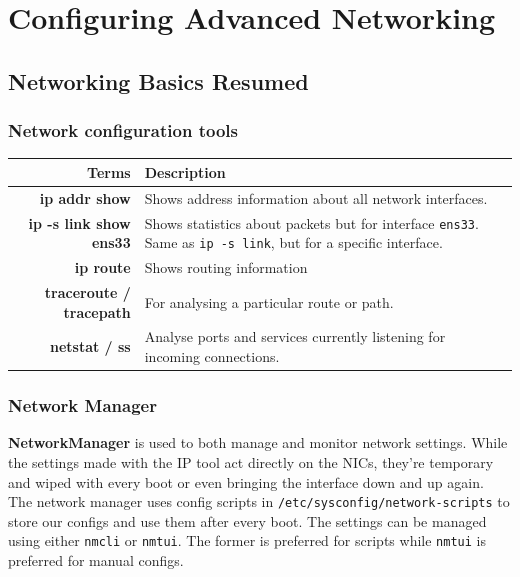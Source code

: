 \chapter{Configuring Advanced Networking}

\section{Networking Basics Resumed}
\subsection{Network configuration tools}
\begin{tabular}{rM{0.68}}
	\toprule
	\textbf{Terms} &\textbf{Description} \\
	\midrule
	\textbf{ip addr show}	&Shows address information about all network interfaces.\\
	\midrule
	\textbf{ip -s link show ens33}	&Shows statistics about packets but for interface \verb|ens33|. Same as \verb|ip -s link|, but for a specific interface. \\
	\midrule
	\textbf{ip route}	&Shows routing information\\
	\midrule
	\textbf{traceroute / tracepath}	&For analysing a particular route or path.\\
	\midrule
	\textbf{netstat / ss}	&Analyse ports and services currently listening for incoming connections.\\
	\bottomrule
\end{tabular}

\subsection{Network Manager}
\textbf{NetworkManager} is used to both manage and monitor network settings. While the settings made with the IP tool act directly on the NICs, they're temporary and wiped with every boot or even bringing the interface down and up again. The network manager uses config scripts in \verb|/etc/sysconfig/network-scripts| to store our configs and use them after every boot. The settings can be managed using either \verb|nmcli| or \verb|nmtui|. The former is preferred for scripts while \verb|nmtui| is preferred for manual configs. 

